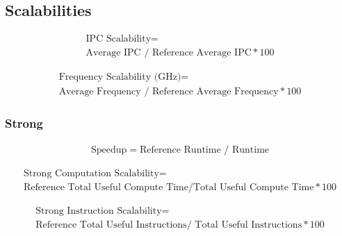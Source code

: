 \documentclass[article,12pt]{memoir}
\begin{document}
	\subsection{Scalabilities}	
	
	\begin{equation}\label{ipcscala}
		\begin{gathered}
			\text{IPC Scalability} =\\
			\text{Average IPC } / \text{ Reference Average IPC} * 100
		\end{gathered}
	\end{equation}
	
	\begin{equation}\label{freqscala}
		\begin{gathered}
			\text{Frequency Scalability (GHz)} =\\
			\text{Average Frequency } / \text{ Reference Average Frequency} * 100
		\end{gathered}
	\end{equation}
	
	\subsubsection{Strong}
	
	\begin{equation}\label{strongspeedup}
		\begin{gathered}
			\text{Speedup} =
			\text{Reference Runtime } / \text{ Runtime}
		\end{gathered}
	\end{equation}
	
	\begin{equation}\label{strongcompscala}
		\begin{gathered}
			\text{Strong Computation Scalability} =\\
			\text{Reference Total Useful Compute Time} / \text{Total Useful Compute Time} * 100
		\end{gathered}
	\end{equation}
	
	\begin{equation}\label{stronginscala}
		\begin{gathered}
			\text{Strong Instruction Scalability} =\\
			\text{Reference Total Useful Instructions} / \text{ Total Useful Instructions} * 100
		\end{gathered}
	\end{equation}
	
\end{document}
